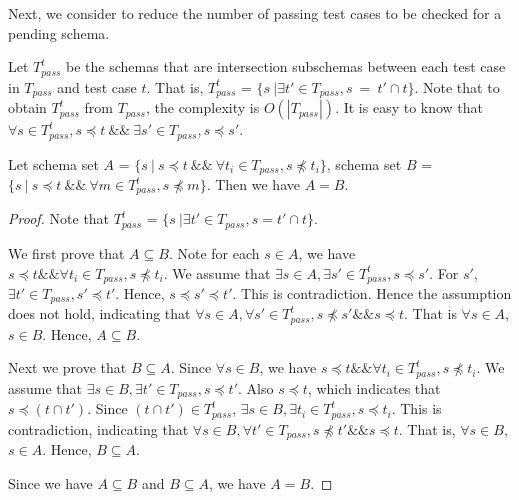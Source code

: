 Next, we consider to reduce the number of passing test cases to be checked for a pending schema.

Let $T_{pass}^{t}$ be the schemas that are intersection subschemas between each test case in $T_{pass}$ and test case $t$. That is, $T_{pass}^{t}$ = $\{ s\ | \exists t' \in  T_{pass}, s\ =\ t' \cap t \}$. Note that to obtain $T_{pass}^{t}$ from $T_{pass}$, the complexity is $O(|T_{pass}|)$.  It is easy to know that $\forall s \in T_{pass}^{t}, s \preceq t \ \&\& \ \exists s' \in T_{pass}, s \preceq s'$.


\begin{proposition}\label{pro:healthysintequal}
Let schema set $A$ = $\{ s\ |\ s \preceq t\ \&\&\  \forall t_{i} \in T_{pass}, s \npreceq t_{i} \} $,  schema set $B$ = $\{ s\ |\ s \preceq t\ \&\&\ \forall m \in T_{pass}^{t}, s \npreceq m \}$. Then we have $A = B$.
\end{proposition}

\begin{proof}
Note that $T_{pass}^{t}$ = $\{ s\ |\exists t' \in T_{pass}, s =  t' \cap t \}$.

We first prove that $A \subseteq B$. Note for each $s \in A$, we have $s \preceq t \&\& \forall t_{i} \in T_{pass}, s \npreceq t_{i}$. We assume that $\exists s \in A, \exists s' \in T_{pass}^{t}, s \preceq s'$. For $s'$, $\exists t' \in T_{pass}, s' \preceq t'$. Hence, $s  \preceq s' \preceq t'$. This is contradiction. Hence the assumption does not hold, indicating that $\forall s \in A, \forall s' \in T_{pass}^{t}, s \npreceq s' \&\& s \preceq t$. That is $\forall s \in A$, $s \in B$. Hence, $A \subseteq B$.

Next we prove that $B \subseteq A$. Since $\forall s \in B$, we have $s \preceq t \&\& \forall t_{i} \in  T_{pass}^{t}, s \npreceq t_{i}$. We assume that $\exists s \in B, \exists t' \in T_{pass}, s \preceq t'$. Also $s \preceq t$, which indicates that $s \preceq (t \cap t')$.  Since $(t \cap t') \in T_{pass}^{t} $, $\exists s \in B, \exists t_{i} \in T_{pass}^{t}, s \preceq t_{i}$. This is contradiction, indicating that  $\forall s \in B, \forall t' \in T_{pass}, s \npreceq t' \&\& s \preceq t$. That is, $\forall s \in B$, $s \in A$. Hence, $B \subseteq A$.

Since we have $A \subseteq B$ and $B \subseteq A$, we have $A = B$.
\end{proof}

